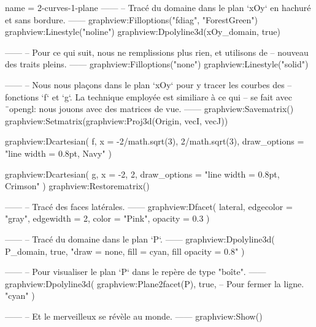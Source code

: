 \documentclass[border = 3pt]{standalone}
\begin{document}
\begin{luadraw}{name = 2-curves-1-plane}
------
-- Tracé du domaine dans le plan `xOy` en hachuré et sans bordure.
------
graphview:Filloptions("fdiag", "ForestGreen")
graphview:Linestyle("noline")
graphview:Dpolyline3d(xOy_domain, true)

------
-- Pour ce qui suit, nous ne remplissions plus rien, et utilisons de
-- nouveau des traits pleins.
------
graphview:Filloptions("none")
graphview:Linestyle("solid")

------
-- Nous nous plaçons dans le plan `xOy` pour y tracer les courbes des
-- fonctions  `f` et `g`. La technique employée est similiare à ce qui
-- se fait avec ¨opengl: nous jouons avec des matrices de vue.
------
graphview:Savematrix()
  graphview:Setmatrix(graphview:Proj3d({Origin, vecI, vecJ}))

  graphview:Dcartesian(
    f,
    {
      x = {-2/math.sqrt(3), 2/math.sqrt(3)},
      draw_options = "line width = 0.8pt, Navy"
    })

  graphview:Dcartesian(
    g,
    {
      x = {-2, 2},
      draw_options = "line width = 0.8pt, Crimson"
    })
graphview:Restorematrix()

------
-- Tracé des faces latérales.
------
graphview:Dfacet(
  lateral,
  {
    edgecolor = "gray",
    edgewidth = 2,
    color     = "Pink",
    opacity   = 0.3
  })

------
-- Tracé du domaine dans le plan `P`.
------
graphview:Dpolyline3d(
  P_domain,
  true,
  "draw = none, fill = cyan, fill opacity = 0.8"
)

------
-- Pour visualiser le plan `P` dans le repère de type "boîte".
------
graphview:Dpolyline3d(
  graphview:Plane2facet(P),
  true,   -- Pour fermer la ligne.
  "cyan"
)

------
-- Et le merveilleux se révèle au monde.
------
graphview:Show()
\end{luadraw}
\end{document}
